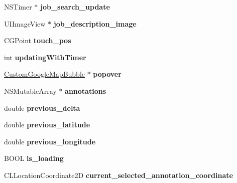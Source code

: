 \begin{DoxyCompactItemize}
\item 
\hypertarget{interface_google_maps_menu_ada549480e94740937f8662cd1b866fe7}{
\-N\-S\-Timer $\ast$ {\bfseries job\-\_\-search\-\_\-update}}
\label{interface_google_maps_menu_ada549480e94740937f8662cd1b866fe7}

\item 
\hypertarget{interface_google_maps_menu_a28e36917d613489a33058e2efeee142d}{
\-U\-I\-Image\-View $\ast$ {\bfseries job\-\_\-description\-\_\-image}}
\label{interface_google_maps_menu_a28e36917d613489a33058e2efeee142d}

\item 
\hypertarget{interface_google_maps_menu_ac955a6d373cdb1ff0126d9db30dfc29b}{
\-C\-G\-Point {\bfseries touch\-\_\-pos}}
\label{interface_google_maps_menu_ac955a6d373cdb1ff0126d9db30dfc29b}

\item 
\hypertarget{interface_google_maps_menu_a30c124347a2ba952cdf1b707955f436e}{
int {\bfseries updating\-With\-Timer}}
\label{interface_google_maps_menu_a30c124347a2ba952cdf1b707955f436e}

\item 
\hypertarget{interface_google_maps_menu_ab45b78975e84bf23508080fd9b5020ed}{
\hyperlink{interface_custom_google_map_bubble}{\-Custom\-Google\-Map\-Bubble} $\ast$ {\bfseries popover}}
\label{interface_google_maps_menu_ab45b78975e84bf23508080fd9b5020ed}

\item 
\hypertarget{interface_google_maps_menu_a89a72fac12fc2b9af7dfe424efa4bcd9}{
\-N\-S\-Mutable\-Array $\ast$ {\bfseries annotations}}
\label{interface_google_maps_menu_a89a72fac12fc2b9af7dfe424efa4bcd9}

\item 
\hypertarget{interface_google_maps_menu_a679a6cd6e70de7189bff4f27e0df7439}{
double {\bfseries previous\-\_\-delta}}
\label{interface_google_maps_menu_a679a6cd6e70de7189bff4f27e0df7439}

\item 
\hypertarget{interface_google_maps_menu_ab68f3765765954b3ecb6c4e9138bf000}{
double {\bfseries previous\-\_\-latitude}}
\label{interface_google_maps_menu_ab68f3765765954b3ecb6c4e9138bf000}

\item 
\hypertarget{interface_google_maps_menu_aefe609f00925eb1cc26f9a358aae0f02}{
double {\bfseries previous\-\_\-longitude}}
\label{interface_google_maps_menu_aefe609f00925eb1cc26f9a358aae0f02}

\item 
\hypertarget{interface_google_maps_menu_a5674239f648cf42d565b2cff684c8ccd}{
\-B\-O\-O\-L {\bfseries is\-\_\-loading}}
\label{interface_google_maps_menu_a5674239f648cf42d565b2cff684c8ccd}

\item 
\hypertarget{interface_google_maps_menu_afbbe2e4cf98c4b22f88ddf2e0a9f7965}{
\-C\-L\-Location\-Coordinate2\-D {\bfseries current\-\_\-selected\-\_\-annotation\-\_\-coordinate}}
\label{interface_google_maps_menu_afbbe2e4cf98c4b22f88ddf2e0a9f7965}

\end{DoxyCompactItemize}



